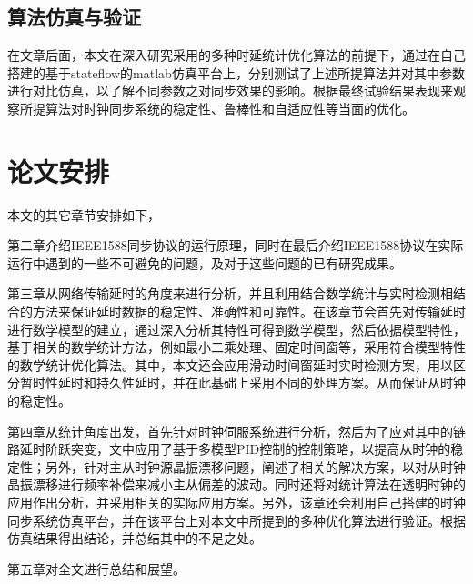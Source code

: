 \subsection{算法仿真与验证}
在文章后面，本文在深入研究采用的多种时延统计优化算法的前提下，通过在自己搭建的基于stateflow的matlab仿真平台上，分别测试了上述所提算法并对其中参数进行对比仿真，以了解不同参数之对同步效果的影响。根据最终试验结果表现来观察所提算法对时钟同步系统的稳定性、鲁棒性和自适应性等当面的优化。

\section{论文安排}
本文的其它章节安排如下，

第二章介绍IEEE1588同步协议的运行原理，同时在最后介绍IEEE1588协议在实际运行中遇到的一些不可避免的问题，及对于这些问题的已有研究成果。

第三章从网络传输延时的角度来进行分析，并且利用结合数学统计与实时检测相结合的方法来保证延时数据的稳定性、准确性和可靠性。在该章节会首先对传输延时进行数学模型的建立，通过深入分析其特性可得到数学模型，然后依据模型特性，基于相关的数学统计方法，例如最小二乘处理、固定时间窗等，采用符合模型特性的数学统计优化算法。其中，本文还会应用滑动时间窗延时实时检测方案，用以区分暂时性延时和持久性延时，并在此基础上采用不同的处理方案。从而保证从时钟的稳定性。

第四章从统计角度出发，首先针对时钟伺服系统进行分析，然后为了应对其中的链路延时阶跃突变，文中应用了基于多模型PID控制的控制策略，以提高从时钟的稳定性；另外，针对主从时钟源晶振漂移问题，阐述了相关的解决方案，以对从时钟晶振漂移进行频率补偿来减小主从偏差的波动。同时还将对统计算法在透明时钟的应用作出分析，并采用相关的实际应用方案。另外，该章还会利用自己搭建的时钟同步系统仿真平台，并在该平台上对本文中所提到的多种优化算法进行验证。根据仿真结果得出结论，并总结其中的不足之处。

第五章对全文进行总结和展望。